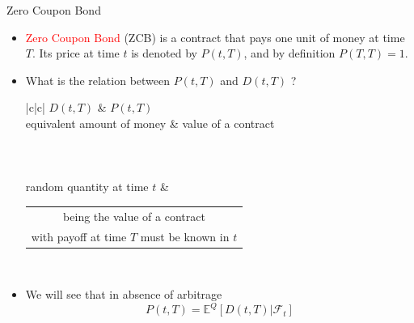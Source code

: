 \documentclass{beamer}
\begin{document}
\begin{frame}{Zero Coupon Bond}
	\begin{itemize}
		\item \textcolor{red}{Zero Coupon Bond} (ZCB) is a contract that pays one unit of money at time $T$. Its price at time $t$ is denoted by $P(t,T)$, and by definition $P(T,T) = 1$.
		\item What is the relation between $P(t,T)$ and $D(t,T)$ ? \\
		\renewcommand{\arraystretch}{1.2}
		\footnotesize{\tiny {\tiny }}{
			\begin{table}[bt]
				\begin{tabular}{|c|c|} \hline
					$D(t, T)$ & $P(t, T)$ \\ \hline
					equivalent amount of money & value of a contract \\ \hline
					 \\ \hline
					 \\ \hline 
					 \\ \hline
					random quantity at time $t$ &
					\renewcommand{\arraystretch}{1.0} 
					\begin{tabular}{@{}c@{}}
						being the value of a contract\\ with payoff at time $T$ must be known in $t$ \\
					\end{tabular} \\ \hline
				\end{tabular}
			\end{table}
		}
		\item We will see that in absence of arbitrage
		\begin{equation*}
			P(t, T) = \mathbb{E}^Q[D(t, T)|\mathcal{F}_t]
		\end{equation*}	
	\end{itemize}
\end{frame}
\end{document}
